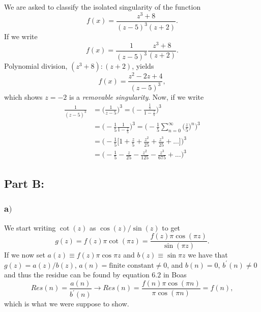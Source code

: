 \documentclass{article}
\begin{document}
We are asked to classify the isolated singularity of the function
\begin{equation}
f(x) = \frac{z^3 + 8}{(z-5)^3(z+2)}.
\end{equation}
If we write
\begin{equation}
f(x) = \frac{1}{(z-5)^3}\frac{z^3+8}{(z+2)}.
\end{equation}
Polynomial division, $(z^3+8):(z+2)$, yields
\begin{equation}
f(x) = \frac{z^2 - 2z + 4}{(z-5)^3},
\end{equation}
which shows $z = -2$ is a \textit{removable singularity}. Now, if we write
\begin{align}
\frac{1}{(z-5)^3} &= \bigg(\frac{1}{z-5}\bigg)^3 = \bigg(-\frac{\frac{1}{5}}{1-\frac{z}{5}}\bigg)^3 \\
 &= \bigg(-\frac{1}{5}\frac{1}{1-\frac{z}{5}}\bigg)^3 = \bigg(-\frac{1}{5}\sum_{n=0}^{\infty}\big(\frac{z}{5}\big)^n\bigg)^3 \\
 &= \bigg(-\frac{1}{5}\bigg[1 + \frac{z}{5} + \frac{z^2}{25} + \frac{z^3}{25} + ... \bigg]\bigg)^3 \\
 &= \bigg(-\frac{1}{5} - \frac{z}{25} - \frac{z^2}{125} - \frac{z^3}{675} + ...\bigg)^3
\end{align}


\subsection*{Part B:}

\subsubsection*{a$)$}
We start writing $\cot{(z)}$ as $\cos{(z)}/\sin{(z)}$ to get
\begin{equation}
g(z) = f(z)\pi\cot{(\pi z)} = \frac{f(z)\pi\cos{(\pi z)}}{\sin{(\pi z)}}.
\end{equation}
If we now set $a(z) \equiv f(z)\pi\cos{\pi z}$ and $b(z) \equiv \sin{\pi z}$ we have that $g(z) = a(z)/b(z)$, $a(n) = \text{finite constant} \neq 0$, and $b(n) = 0$, $b^{'}(n) \neq 0$ and thus the residue can be found by equation $6.2$ in Boas
\begin{equation}
Res(n) = \frac{a(n)}{b^{'}(n)} \rightarrow Res(n) = \frac{f(n)\pi\cos(\pi n)}{\pi\cos(\pi n)} = f(n),
\end{equation}
which is what we were suppose to show.
\end{document}
